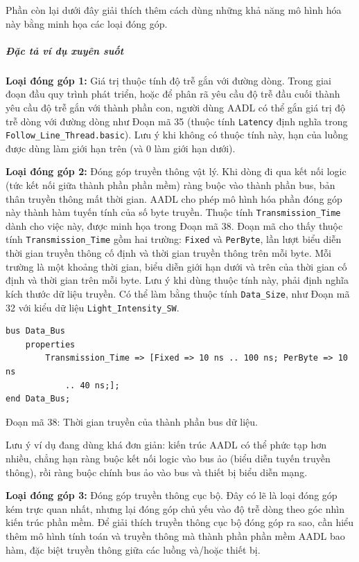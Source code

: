 Phần còn lại dưới đây giải thích thêm cách dùng những khả năng mô hình hóa này bằng minh họa các loại đóng góp.

\subparagraph{Đặc tả ví dụ xuyên suốt}
\textbf{Loại đóng góp 1:} Giá trị thuộc tính độ trễ gắn với đường dòng. Trong giai đoạn đầu quy trình phát triển, hoặc để phân rã yêu cầu độ trễ đầu cuối thành yêu cầu độ trễ gắn với thành phần con, người dùng AADL có thể gắn giá trị độ trễ dòng với đường dòng như Đoạn mã 35 (thuộc tính \texttt{Latency} định nghĩa trong \texttt{Follow\_Line\_Thread.basic}). Lưu ý khi không có thuộc tính này, hạn của luồng được dùng làm giới hạn trên (và 0 làm giới hạn dưới).

\textbf{Loại đóng góp 2:} Đóng góp truyền thông vật lý. Khi dòng đi qua kết nối logic (tức kết nối giữa thành phần phần mềm) ràng buộc vào thành phần bus, bản thân truyền thông mất thời gian. AADL cho phép mô hình hóa phần đóng góp này thành hàm tuyến tính của số byte truyền.
Thuộc tính \texttt{Transmission\_Time} dành cho việc này, được minh họa trong Đoạn mã 38. Đoạn mã cho thấy thuộc tính \texttt{Transmission\_Time} gồm hai trường: \texttt{Fixed} và \texttt{PerByte}, lần lượt biểu diễn thời gian truyền thông cố định và thời gian truyền thông trên mỗi byte. Mỗi trường là một khoảng thời gian, biểu diễn giới hạn dưới và trên của thời gian cố định và thời gian trên mỗi byte. Lưu ý khi dùng thuộc tính này, phải định nghĩa kích thước dữ liệu truyền. Có thể làm bằng thuộc tính \texttt{Data\_Size}, như Đoạn mã 32 với kiểu dữ liệu \texttt{Light\_Intensity\_SW}.
\begin{verbatim}
bus Data_Bus
    properties
        Transmission_Time => [Fixed => 10 ns .. 100 ns; PerByte => 10 ns
            .. 40 ns;];
end Data_Bus;
\end{verbatim}
\begin{center}\small Đoạn mã 38: Thời gian truyền của thành phần bus dữ liệu.\end{center}

Lưu ý ví dụ đang dùng khá đơn giản: kiến trúc AADL có thể phức tạp hơn nhiều, chẳng hạn ràng buộc kết nối logic vào bus ảo (biểu diễn tuyến truyền thông), rồi ràng buộc chính bus ảo vào bus và thiết bị biểu diễn mạng.

\textbf{Loại đóng góp 3:} Đóng góp truyền thông cục bộ. Đây có lẽ là loại đóng góp kém trực quan nhất, nhưng lại đóng góp chủ yếu vào độ trễ dòng theo góc nhìn kiến trúc phần mềm. Để giải thích truyền thông cục bộ đóng góp ra sao, cần hiểu thêm mô hình tính toán và truyền thông mà thành phần phần mềm AADL bao hàm, đặc biệt truyền thông giữa các luồng và/hoặc thiết bị.

